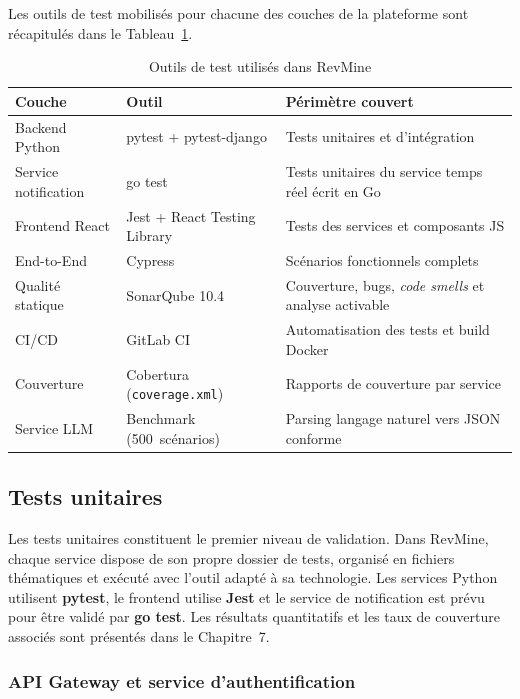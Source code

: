 Les outils de test mobilisés pour chacune des couches de la plateforme sont récapitulés dans le
Tableau~\ref{tab:outils-tests}.

\begin{table}[H]
\centering
\small
\caption{Outils de test utilisés dans RevMine}
\label{tab:outils-tests}
\begin{tabular}{|>{\raggedright\arraybackslash}p{3.5cm}
                |>{\raggedright\arraybackslash}p{3.8cm}
                |>{\raggedright\arraybackslash}p{5.5cm}|}
\hline
\textbf{Couche} & \textbf{Outil} & \textbf{Périmètre couvert} \\
\hline
Backend Python & pytest + pytest-django & Tests unitaires et d'intégration \\
\hline
Service notification & go test & Tests unitaires du service temps réel écrit en Go \\
\hline
Frontend React & Jest + React Testing Library & Tests des services et composants JS \\
\hline
End-to-End & Cypress & Scénarios fonctionnels complets \\
\hline
Qualité statique & SonarQube 10.4 & Couverture, bugs, \textit{code smells} et analyse activable \\
\hline
CI/CD & GitLab CI & Automatisation des tests et build Docker \\
\hline
Couverture & Cobertura (\texttt{coverage.xml}) & Rapports de couverture par service \\
\hline
Service LLM & Benchmark (500~scénarios) & Parsing langage naturel vers JSON conforme \\
\hline
\end{tabular}
\end{table}

\subsection{Tests unitaires}

Les tests unitaires constituent le premier niveau de validation. Dans RevMine, chaque service
dispose de son propre dossier de tests, organisé en fichiers thématiques et exécuté avec l'outil
adapté à sa technologie. Les services Python utilisent \textbf{pytest}, le frontend utilise
\textbf{Jest} et le service de notification est prévu pour être validé par \textbf{go test}.
Les résultats quantitatifs et les taux de couverture associés sont présentés dans le
Chapitre~7.

\subsubsection*{API Gateway et service d'authentification}


